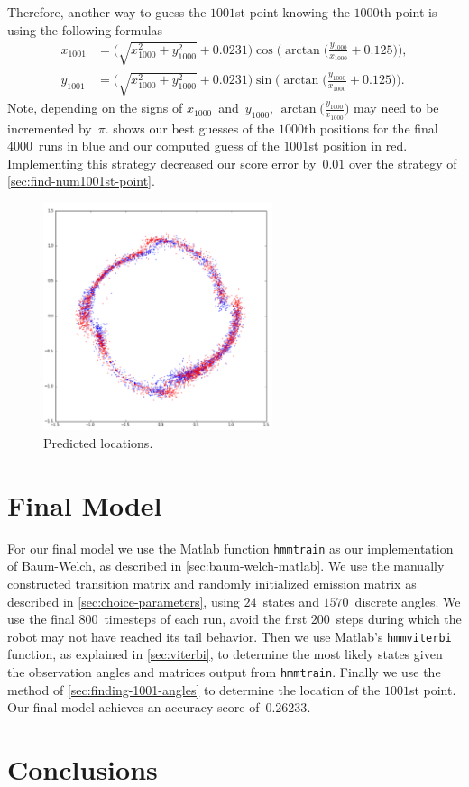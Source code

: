 \documentclass[twoside]{article}
\begin{document}
Therefore, another way to guess the $\num{1001}$st point knowing the $\num{1000}$th point is using the following formulas
\begin{align*}
  x_{\num{1001}} &= \Big( \sqrt{x_{\num{1000}}^2 + y_{\num{1000}}^2} + 0.0231 \Big) \cos \Big( \arctan \Big(\frac{y_{\num{1000}}}{x_{\num{1000}}} + 0.125 \Big) \Big),\\
  y_{\num{1001}} &= \Big( \sqrt{x_{\num{1000}}^2 + y_{\num{1000}}^2} + 0.0231 \Big) \sin \Big( \arctan \Big(\frac{y_{\num{1000}}}{x_{\num{1000}}} + 0.125 \Big) \Big).
\end{align*}
Note, depending on the signs of $x_{\num{1000}}$~and~$y_{\num{1000}}$, $\arctan \Big( \frac{y_{\num{1000}}}{x_{\num{1000}}} \Big)$ may need to be incremented by~$\pi$.
 shows our best guesses of the $\num{1000}$th positions for the final $\num{4000}$~runs in blue and our computed guess of the $\num{1001}$st position in red.
Implementing this strategy decreased our score error by~$0.01$ over the strategy of \cref{sec:find-num1001st-point}.
\begin{figure}[h]
  \centering
  \includegraphics[width=0.6\textwidth]{images/AK8}
  \caption{Predicted locations.}\label{fig:shifted-angles}
\end{figure}

\section{Final Model}\label{sec:final-model}

For our final model we use the Matlab function \texttt{\small{}hmmtrain} as our implementation of Baum-Welch, as described in \cref{sec:baum-welch-matlab}.
We use the manually constructed transition matrix and randomly initialized emission matrix as described in \cref{sec:choice-parameters}, using $24$~states and $1570$~discrete angles.
We use the final $800$~timesteps of each run, avoid the first $200$~steps during which the robot may not have reached its tail behavior.
Then we use Matlab's \texttt{\small{}hmmviterbi} function, as explained in \cref{sec:viterbi}, to determine the most likely states given the observation angles and matrices output from \texttt{\small{}hmmtrain}.
Finally we use the method of \cref{sec:finding-1001-angles} to determine the location of the $\num{1001}$st point.
Our final model achieves an accuracy score of~$\bm{0.26233}$.


\section{Conclusions}\label{sec:conclusions}
\end{document}

